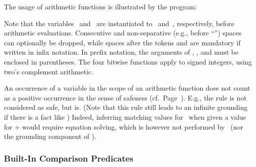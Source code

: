 \begin{example}\label{ex:arith:fun}
The usage of arithmetic functions is illustrated by the program:%
%

%
Note that the variables~ and~ are instantiated to~ and~,
respectively, before arithmetic evaluations.
Consecutive and non-separative (e.g., before ``\code{(}'')
spaces can optionally be dropped,
while spaces after the tokens  and  are mandatory
if written in infix notation.
In prefix notation, the arguments of , , and 
must be enclosed in parentheses.
The four bitwise functions apply to signed integers,
using two's complement arithmetic. %
\eexample
\end{example}

\begin{Note}
An occurrence of a variable in the scope of an arithmetic function
does not count as a positive occurrence in the sense of safeness (cf.\ Page~\pageref{pg:safe}).
E.g., the rule 
is not considered as safe, but  is.
(Note that this rule still leads to an infinite grounding
 if there is a fact like )
Indeed, inferring matching values for~ when given a value for +
would require equation solving, which is however not performed by
\gringo\ (nor the grounding component of \clingo).
%
\end{Note}

\subsubsection{Built-In Comparison Predicates}\label{subsec:gringo:comp}

